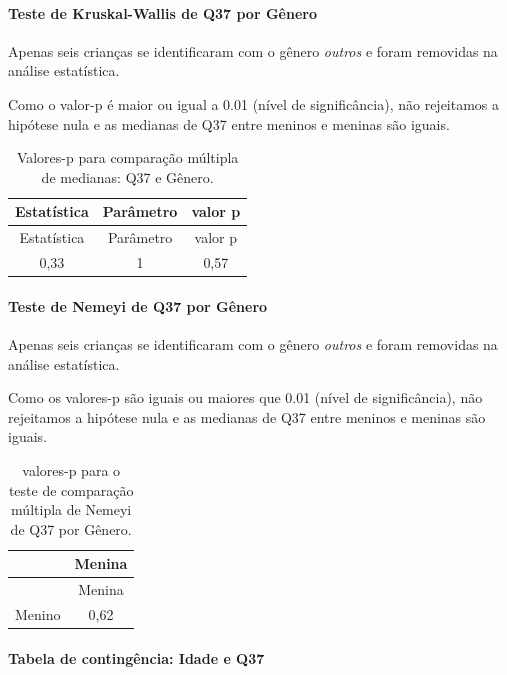 \documentclass[]{article}
\let\oldparagraph\paragraph
\renewcommand{\paragraph}[1]{\oldparagraph{#1}\mbox{}}
\begin{document}
\hypertarget{teste-de-kruskal-wallis-de-q37-por-guxeanero}{%
\paragraph{Teste de Kruskal-Wallis de Q37 por Gênero}\label{teste-de-kruskal-wallis-de-q37-por-guxeanero}}

Apenas seis crianças se identificaram com o gênero \emph{outros} e foram removidas na análise estatística.

Como o valor-p é maior ou igual a 0.01 (nível de significância), não rejeitamos a hipótese nula e as medianas de Q37 entre meninos e meninas são iguais.

\begin{longtable}[]{@{}ccc@{}}
\caption{\label{tab:unnamed-chunk-1386}Valores-p para comparação múltipla de medianas: Q37 e Gênero.}\tabularnewline
\toprule
Estatística & Parâmetro & valor p\tabularnewline
\midrule
\endfirsthead
\toprule
Estatística & Parâmetro & valor p\tabularnewline
\midrule
\endhead
0,33 & 1 & 0,57\tabularnewline
\bottomrule
\end{longtable}

\hypertarget{teste-de-nemeyi-de-q37-por-guxeanero}{%
\paragraph{Teste de Nemeyi de Q37 por Gênero}\label{teste-de-nemeyi-de-q37-por-guxeanero}}

Apenas seis crianças se identificaram com o gênero \emph{outros} e foram removidas na análise estatística.

Como os valores-p são iguais ou maiores que 0.01 (nível de significância), não rejeitamos a hipótese nula e as medianas de Q37 entre meninos e meninas são iguais.

\begin{longtable}[]{@{}lc@{}}
\caption{\label{tab:unnamed-chunk-1388}valores-p para o teste de comparação múltipla de Nemeyi de Q37 por Gênero.}\tabularnewline
\toprule
& Menina\tabularnewline
\midrule
\endfirsthead
\toprule
& Menina\tabularnewline
\midrule
\endhead
Menino & 0,62\tabularnewline
\bottomrule
\end{longtable}

\cleardoublepage

\hypertarget{tabela-de-continguxeancia-idade-e-q37}{%
\paragraph{Tabela de contingência: Idade e Q37}\label{tabela-de-continguxeancia-idade-e-q37}}
\end{document}
